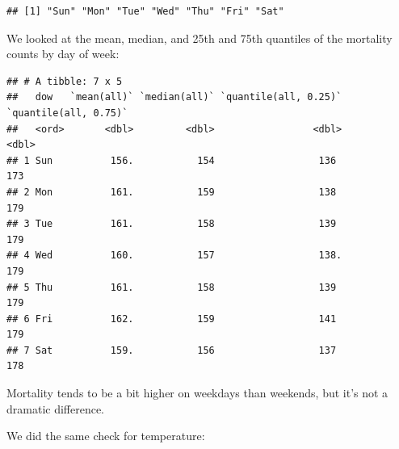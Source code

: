 \documentclass[
]{book}
\newenvironment{Shaded}{\begin{snugshade}}{\end{snugshade}}
\newcommand{\FloatTok}[1]{\textcolor[rgb]{0.00,0.00,0.81}{#1}}
\newcommand{\KeywordTok}[1]{\textcolor[rgb]{0.13,0.29,0.53}{\textbf{#1}}}
\newcommand{\NormalTok}[1]{#1}
\newcommand{\OperatorTok}[1]{\textcolor[rgb]{0.81,0.36,0.00}{\textbf{#1}}}
\newcommand{\StringTok}[1]{\textcolor[rgb]{0.31,0.60,0.02}{#1}}
\begin{document}
\begin{verbatim}
## [1] "Sun" "Mon" "Tue" "Wed" "Thu" "Fri" "Sat"
\end{verbatim}

We looked at the mean, median, and 25th and 75th quantiles of the mortality
counts by day of week:

\begin{Shaded}
\end{Shaded}

\begin{verbatim}
## # A tibble: 7 x 5
##   dow   `mean(all)` `median(all)` `quantile(all, 0.25)` `quantile(all, 0.75)`
##   <ord>       <dbl>         <dbl>                 <dbl>                 <dbl>
## 1 Sun          156.           154                  136                    173
## 2 Mon          161.           159                  138                    179
## 3 Tue          161.           158                  139                    179
## 4 Wed          160.           157                  138.                   179
## 5 Thu          161.           158                  139                    179
## 6 Fri          162.           159                  141                    179
## 7 Sat          159.           156                  137                    178
\end{verbatim}

Mortality tends to be a bit higher on weekdays than weekends, but it's not
a dramatic difference.

We did the same check for temperature:

\begin{Shaded}
\end{Shaded}
\end{document}
